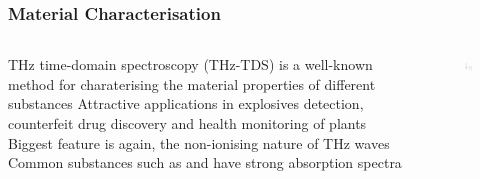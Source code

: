 \documentclass[10pt]{beamer}
\begin{document}
\begin{frame}
    \frametitle{Material Characterisation}

    \small
    \begin{columns}
        \begin{column}{.4\textwidth}
            \begin{outline}
                \1 THz time-domain spectroscopy (THz-TDS) is a well-known method for charaterising the material properties of different substances
                \2 Attractive applications in explosives detection, counterfeit drug discovery and health monitoring of plants
                \1 Biggest feature is again, the non-ionising nature of THz waves
                \1 Common substances such as  and  have strong absorption spectra
             \end{outline}
        \end{column}
        \begin{column}{.6\textwidth}
            \scriptsize
            \begin{figure}[T!]
                \centering
                \includegraphics[width=.95\textwidth]{nitrogen.pdf}
                \label{fig:nitrogen}
            \end{figure}
        \end{column}
    \end{columns}
\end{frame}
\end{document}
